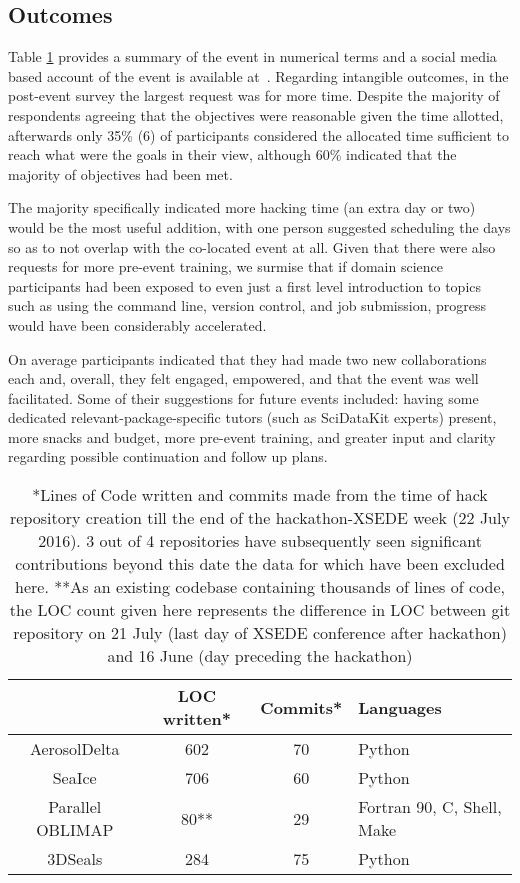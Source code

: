\documentclass[conference]{IEEEtran}
\begin{document}
\subsection{Outcomes}
Table \ref{stats} provides a summary of the event in numerical terms and a social media based account of the event is available at~\cite{noauthor_undated-az}.  Regarding intangible outcomes, in the post-event survey the largest request was for more time.  Despite the majority of respondents agreeing that the objectives were reasonable given the time allotted, afterwards only 35\% (6) of participants considered the allocated time sufficient to reach what were the goals in their view, although 60\% indicated that the majority of objectives had been met.  

The majority specifically indicated more hacking time (an extra day or two) would be the most useful addition, with one person suggested scheduling the days so as to not overlap with the co-located event at all.  Given that there were also requests for more pre-event training, we surmise that if domain science participants had been exposed to even just a first level introduction to topics such as using the command line, version control, and job submission, progress would have been considerably accelerated.

On average participants indicated that they had made two new collaborations each and, overall, they felt engaged, empowered, and that the event was well facilitated.  Some of their suggestions for future events included: having some dedicated relevant-package-specific tutors (such as SciDataKit experts) present, more snacks and budget, more pre-event training, and greater input and clarity regarding possible continuation and follow up plans.


\begin{table}[!t]
\centering
\renewcommand{\arraystretch}{1.3}

\caption{*Lines of Code written and commits made from the time of hack repository creation till the end of the hackathon-XSEDE week (22 July 2016).  3 out of 4 repositories have subsequently seen significant contributions beyond this date the data for which have been excluded here.
**As an existing codebase containing thousands of lines of code, the LOC count given here represents the difference in LOC between git repository on 21 July (last day of XSEDE conference after hackathon) and 16 June (day preceding the hackathon)}
\label{stats}
\centering
\begin{tabular}{|c|c|c|p{2cm}|}
\hline
&LOC written* & Commits* & Languages\\
\hline
AerosolDelta & 602 & 70 & Python\\
\hline
SeaIce & 706 & 60 & Python\\
\hline
Parallel OBLIMAP & 80** & 29 & Fortran 90, C, Shell, Make\\
\hline
3DSeals & 284 & 75 & Python\\
\hline
\end{tabular}
\end{table}
\end{document}
